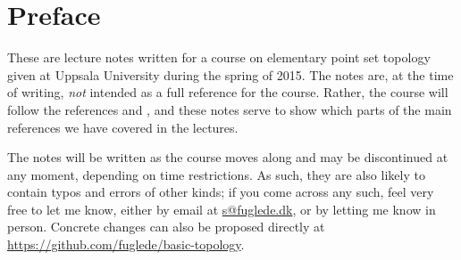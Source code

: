 \section{Preface}

These are lecture notes written for a course on elementary point set topology given at Uppsala University during the spring of 2015. The notes are, at the time of writing, \emph{not} intended as a full reference for the course. Rather, the course will follow the references \cite{Mun} and \cite{Fje}, and these notes serve to show which parts of the main references we have covered in the lectures.

The notes will be written as the course moves along and may be discontinued at any moment, depending on time restrictions. As such, they are also likely to contain typos and errors of other kinds; if you come across any such, feel very free to let me know, either by email at \href{mailto:s@fuglede.dk}{\textsf{s@fuglede.dk}}, or by letting me know in person. Concrete changes can also be proposed directly at \href{https://github.com/fuglede/basic-topology}{\textsf{https://github.com/fuglede/basic-topology}}.
